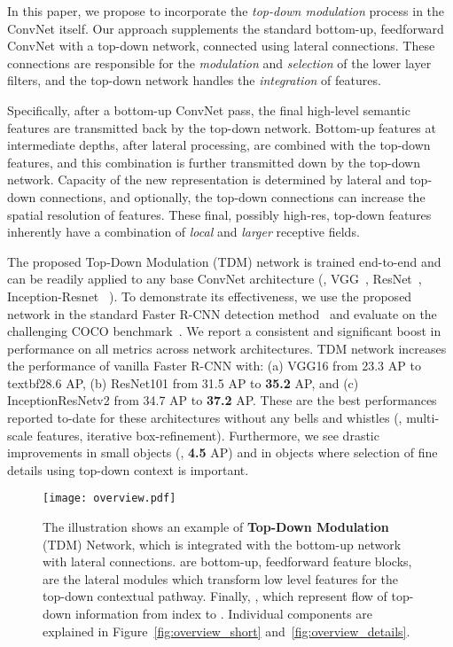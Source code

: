 \documentclass[10pt,twocolumn,letterpaper]{article}
\begin{document}
In this paper, we propose to incorporate the \emph{top-down modulation} process in the ConvNet itself. Our approach supplements the standard bottom-up, feedforward ConvNet with a top-down network, connected using lateral connections. These connections are responsible for the \emph{modulation} and \emph{selection} of the lower layer filters, and the top-down network handles the \emph{integration} of features.

Specifically, after a bottom-up ConvNet pass, the final high-level semantic features are transmitted back by the top-down network. Bottom-up features at intermediate depths, after lateral processing, are combined with 
the top-down features, and this combination is further transmitted down by the top-down network. Capacity of the new representation is determined by lateral and top-down connections, and optionally, the top-down connections can increase the spatial resolution of features. These final, possibly high-res, top-down features inherently have a combination of \emph{local} and \emph{larger} receptive fields. 

The proposed Top-Down Modulation (TDM) network is trained end-to-end and can be readily applied to any base ConvNet architecture (\eg, VGG~\cite{VGG}, ResNet~\cite{resnet}, Inception-Resnet~\cite{szegedy2016inception} \etc). To demonstrate its effectiveness, we use the proposed network in the standard Faster R-CNN detection method~\cite{ren2015faster} and evaluate on the challenging COCO benchmark~\cite{lin2014coco}. We report a consistent and significant boost in performance on all metrics across network architectures. 
TDM network increases the performance of vanilla Faster R-CNN with: (a) VGG16 from 23.3 AP to textbf{28.6} AP, (b) ResNet101 from 31.5 AP to \textbf{35.2} AP, and (c) InceptionResNetv2 from 34.7 AP to \textbf{37.2} AP. These are the best performances reported to-date for these architectures without any bells and whistles (\eg, multi-scale features, iterative box-refinement).
Furthermore, we see drastic improvements in small objects (\eg, \textbf{4.5} AP) and in objects where selection of fine details using top-down context is important.

\begin{figure*}
    \centering
        \vspace{-0.1in}
    \texttt{[image: overview.pdf]}
            \vspace{-0.07in}
    \caption{The illustration shows an example of \textbf{Top-Down Modulation} (TDM) Network, which is integrated with the bottom-up network with lateral connections.  are bottom-up, feedforward feature blocks,  are the lateral modules which transform low level features for the top-down contextual pathway. Finally, , which represent flow of top-down information from index  to . Individual components are explained in Figure~\ref{fig:overview_short} and~\ref{fig:overview_details}.
    }
    \vspace{-0.2in}
    \label{fig:overview_long}
\end{figure*}
\end{document}
